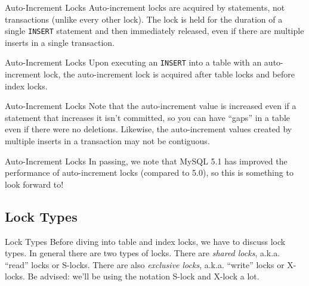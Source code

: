 \documentclass[14pt]{beamer}
\begin{document}
\begin{frame}{Auto-Increment Locks}
  Auto-increment locks are acquired by statements, not transactions (unlike
  every other lock).
  \newline
  \newline
  The lock is held for the duration of a single \texttt{INSERT} statement and
  then immediately released, even if there are multiple inserts in a single
  transaction.
\end{frame}

\begin{frame}{Auto-Increment Locks}
  Upon executing an \texttt{INSERT} into a table with an auto-increment lock,
  the auto-increment lock is acquired after table locks and before index
  locks.
\end{frame}

\begin{frame}{Auto-Increment Locks}
  Note that the auto-increment value is increased even if a statement that
  increases it isn't committed, so you can have ``gaps'' in a table even if
  there were no deletions.
  \newline
  \newline
  \pause
  Likewise, the auto-increment values created by multiple inserts in a
  transaction may not be contiguous.
\end{frame}

\begin{frame}{Auto-Increment Locks}
  In passing, we note that MySQL 5.1 has improved the performance of
  auto-increment locks (compared to 5.0), so this is something to look forward
  to!
\end{frame}

\subsection{Lock Types}

\begin{frame}{Lock Types}
  Before diving into table and index locks, we have to discuss lock types. In
  general there are two types of locks. There are \emph{shared locks},
  a.k.a. ``read'' locks or S-locks.
  \newline
  \newline
  There are also \emph{exclusive locks}, a.k.a. ``write'' locks or X-locks.
  \newline
  \newline
  \pause
  Be advised: we'll be using the notation S-lock and X-lock a lot.
\end{frame}
\end{document}
